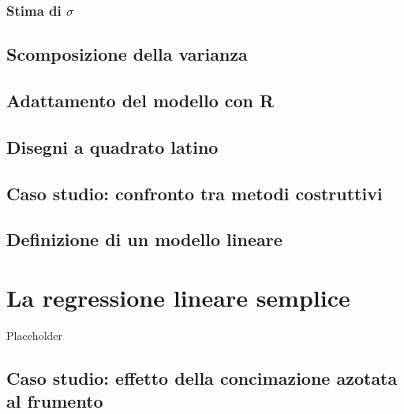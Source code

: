 \documentclass[a4paper,12pt,oneside]{book}
\begin{document}
\hypertarget{stima-di-sigma-1}{%
\subsection{\texorpdfstring{Stima di \(\sigma\)}{Stima di \textbackslash sigma}}\label{stima-di-sigma-1}}

\hypertarget{scomposizione-della-varianza-1}{%
\section{Scomposizione della varianza}\label{scomposizione-della-varianza-1}}

\hypertarget{adattamento-del-modello-con-r}{%
\section{Adattamento del modello con R}\label{adattamento-del-modello-con-r}}

\hypertarget{disegni-a-quadrato-latino-1}{%
\section{Disegni a quadrato latino}\label{disegni-a-quadrato-latino-1}}

\hypertarget{caso-studio-confronto-tra-metodi-costruttivi}{%
\section{Caso studio: confronto tra metodi costruttivi}\label{caso-studio-confronto-tra-metodi-costruttivi}}

\hypertarget{definizione-di-un-modello-lineare-2}{%
\section{Definizione di un modello lineare}\label{definizione-di-un-modello-lineare-2}}

\hypertarget{la-regressione-lineare-semplice}{%
\chapter{La regressione lineare semplice}\label{la-regressione-lineare-semplice}}

Placeholder

\hypertarget{caso-studio-effetto-della-concimazione-azotata-al-frumento}{%
\section{Caso studio: effetto della concimazione azotata al frumento}\label{caso-studio-effetto-della-concimazione-azotata-al-frumento}}
\end{document}
